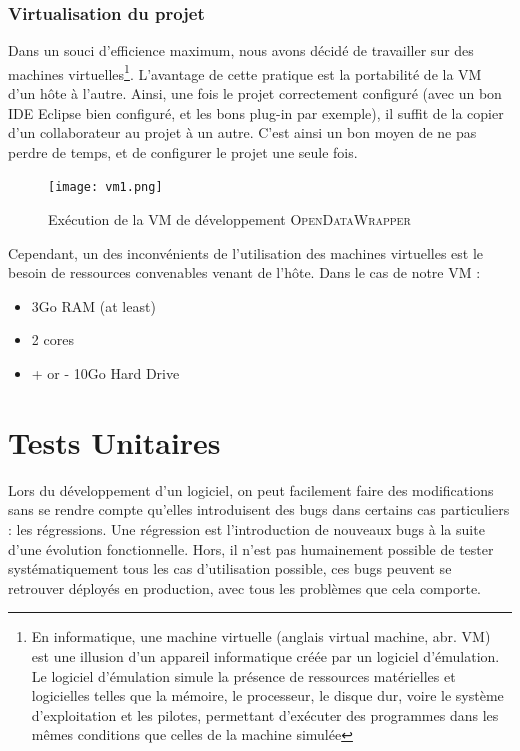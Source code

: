\documentclass[a4paper,11pt]{article}
\begin{document}
\subsubsection{Virtualisation du projet}

Dans un souci d'efficience maximum, nous avons décidé de travailler sur des machines virtuelles\footnote{En informatique, une machine virtuelle (anglais virtual machine, abr. VM) est une illusion d'un appareil informatique créée par un logiciel d'émulation. Le logiciel d'émulation simule la présence de ressources matérielles et logicielles telles que la mémoire, le processeur, le disque dur, voire le système d'exploitation et les pilotes, permettant d'exécuter des programmes dans les mêmes conditions que celles de la machine simulée}. L'avantage de cette pratique est la portabilité de la VM d'un hôte à l'autre. Ainsi, une fois le projet correctement configuré (avec un bon IDE Eclipse bien configuré, et les bons plug-in par exemple), il suffit de la copier d'un collaborateur au projet à un autre. C'est ainsi un bon moyen de ne pas perdre de temps, et de configurer le projet une seule fois.

\begin{figure}[!ht]
		\center
		\texttt{[image: vm1.png]}
		\caption{Exécution de la VM de développement \textsc{OpenDataWrapper}}
\end{figure}

Cependant, un des inconvénients de l'utilisation des machines virtuelles est le besoin de ressources convenables venant de l'hôte. Dans le cas de notre VM :
\begin{itemize}
\item 3Go RAM (at least)
\item 2 cores
\item + or - 10Go Hard Drive
\end{itemize} 




\section{Tests Unitaires}

Lors du développement d'un logiciel, on peut facilement faire des modifications sans se rendre compte qu'elles introduisent des bugs dans certains cas particuliers : les régressions. Une régression est l'introduction de nouveaux bugs à la suite d'une évolution fonctionnelle. Hors, il n'est pas humainement possible de tester systématiquement tous les cas d'utilisation possible, ces bugs peuvent se retrouver déployés en production, avec tous les problèmes que cela comporte.
\end{document}
